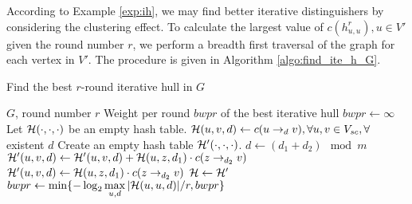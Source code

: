 According to Example \ref{exp:ih}, we may find better iterative distinguishers by considering the clustering effect. To calculate the largest value of $c(h_{u,u}^r),u\in V'$ given the round number $r$, we perform a breadth first traversal of the graph for each vertex in $V'$. The procedure is given in Algorithm \ref{algo:find_ite_h_G}.


\begin{algorithm}
	\caption{Find the best $r$-round iterative hull in $G$}
	\label{algo:find_ite_h_G}
	\begin{algorithmic}[1]
        \Require $G$, round number $r$
        \Ensure Weight per round $bwpr$ of the best iterative hull
        \Procedure {}{}
        \State $bwpr\leftarrow\infty$
        \State Let $\mathcal{H}(\cdot,\cdot,\cdot)$ be an empty hash table. 
        \State $\mathcal{H}(u,v,d)\leftarrow c(u\rightarrow_d v),\forall u,v\in V_{sc},\forall$ existent $d$
        \State Create an empty hash table $\mathcal{H}'(\cdot,\cdot,\cdot)$.
        \State $d\leftarrow (d_1+d_2)\mod m$
        \State $\mathcal{H}'(u,v,d)\leftarrow\mathcal{H}'(u,v,d)+\mathcal{H}(u,z,d_1)\cdot c(z\rightarrow_{d_2} v)$
        \Else
        \State $\mathcal{H}'(u,v,d)\leftarrow\mathcal{H}(u,z,d_1)\cdot c(z\rightarrow_{d_2} v)$
        \EndIf
        \EndFor
        \State $\mathcal{H}\leftarrow \mathcal{H}'$
        \EndFor
        \State $bwpr\leftarrow \min\{-\log_2\max\limits_{u,d}|\mathcal{H}(u,u,d)|/r,bwpr\}$
        \EndFor
        \EndProcedure
	\end{algorithmic}
\end{algorithm}